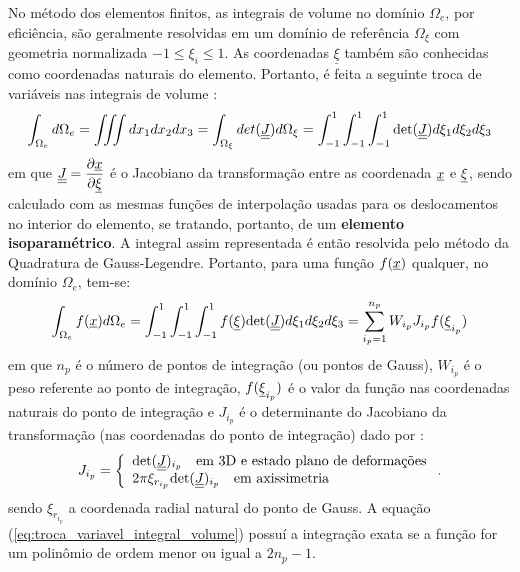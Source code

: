 No método dos elementos finitos, as integrais de volume no domínio  $\Omega_e$, por eficiência, são geralmente resolvidas em um domínio de referência $\Omega_\xi$ com geometria normalizada $-1 \le \xi_i \le 1$. As coordenadas $\underline \xi$ também são conhecidas como coordenadas naturais do elemento. Portanto, é feita a seguinte troca de variáveis nas integrais de volume \cite[p. 147]{Zienkiewicz2005}:
\begin{equation}
	\label{eq:troca_variavel_integral_volume}
	\int_{\Omega_e}d\Omega_e = \iiint dx_1 dx_2 dx_3 = \int_{\Omega_\xi}det(\underline{\underline J})d\Omega_\xi = \int_{-1}^{1}\int_{-1}^{1}\int_{-1}^{1}\text{det}(\underline{\underline J})d\xi_1d\xi_2d\xi_3
\end{equation}
em que $\underline{\underline J} = \dfrac{\partial \underline x}{\partial \underline{\xi}}$  é o Jacobiano da transformação entre as coordenada $\underline x$ e $\underline{\xi}$, sendo calculado com as mesmas funções de interpolação usadas para os deslocamentos no interior do elemento, se tratando, portanto, de um \textbf{elemento isoparamétrico}. A integral assim representada é então resolvida pelo método da Quadratura de Gauss-Legendre. Portanto, para uma função $f(\underline x)$ qualquer, no domínio $\Omega_e$, tem-se:
\begin{equation}
	\label{eq:troca_variavel_integral_volume}
	\int_{\Omega_e}f(\underline x)d\Omega_e = \int_{-1}^{1}\int_{-1}^{1}\int_{-1}^{1}f(\underline{\xi})\text{det}(\underline{\underline J})d\xi_1d\xi_2d\xi_3 = \sum_{i_p=1}^{n_p}W_{i_p}J_{i_p}f(\underline{\xi}_{i_p})
\end{equation}
em que $n_p$ é o número de pontos de integração (ou pontos de Gauss), $W_{i_p}$ é o peso referente ao ponto de integração, $f(\underline{\xi}_{i_p})$ é o valor da função nas coordenadas naturais do ponto de integração e $J_{i_p}$ é o determinante do Jacobiano da transformação (nas coordenadas do ponto de integração) dado por \cite[p. 206-207]{Zienkiewicz2005}:
\begin{equation}
	\label{eq:jacobiano_transformacao}
	J_{i_p} = \left\{
	\begin{array}{lcl}
		 \text{det}(\underline{\underline J})_{i_p}~~~\text{em 3D e estado plano de deformações} \\
		2\pi\xi_{r_{i_p}}\text{det}(\underline{\underline J})_{i_p} ~~~\text{em axissimetria}
	\end{array}
\right..
\end{equation}
sendo $\xi_{r_{i_p}}$ a coordenada radial natural do ponto de Gauss. A equação (\ref{eq:troca_variavel_integral_volume}) possuí a integração exata se a função for um polinômio de ordem menor ou igual a $2n_p-1$.

